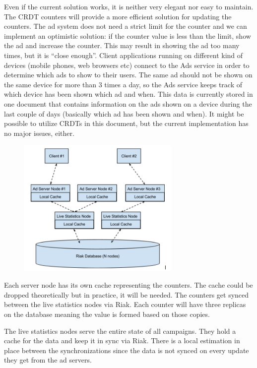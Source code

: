 \documentclass[11pt,a4paper]{report}
\begin{document}
Even if the current solution works, it is neither very elegant nor easy to maintain. The CRDT counters will provide a more efficient solution for updating the counters. The ad system does not need a strict limit for the counter and we can implement an optimistic solution: if the counter value is less than the limit, show the ad and increase the counter. This may result in showing the ad too many times, but it is ``close enough''. Client applications running on different kind of devices (mobile phones, web browsers etc) connect to the Ads service in order to determine which ads to show to their users. The same ad should not be shown on the same device for more than 3 times a day, so the Ads service keeps track of which device has been shown which ad and when. This data is currently stored in one document that contains information on the ads shown on a device during the last couple of days (basically which ad has been shown and when). It might be possible to utilize CRDTs in this document, but the current implementation has no major issues, either.

\begin{figure}[!h]
	\centering
	\includegraphics[width=0.7\textwidth]{./img/image1.png}
\end{figure}
Each server node has its own cache representing the counters. The cache could be dropped theoretically but in practice, it will be needed. The counters get synced between the live statistics nodes via Riak. Each counter will have three replicas on the database meaning the value is formed based on those copies.

The live statistics nodes serve the entire state of all campaigns. They hold a cache for the data and keep it in sync via Riak. There is a local estimation in place between the synchronizations since the data is not synced on every update they get from the ad servers.
\end{document}
